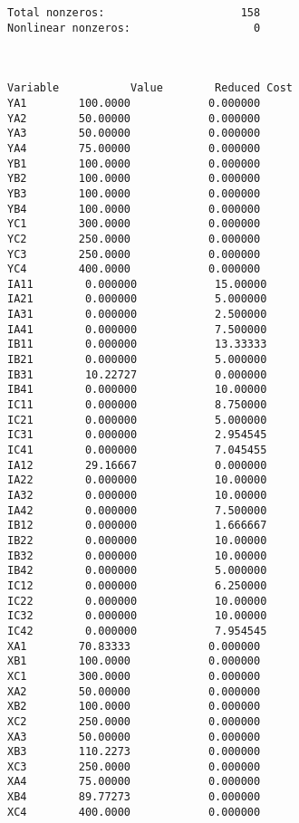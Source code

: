 \documentclass[12pt]{article}
\begin{document}
\begin{appendices}
\begin{lstlisting}
Total nonzeros:                     158
Nonlinear nonzeros:                   0



Variable           Value        Reduced Cost
YA1        100.0000            0.000000
YA2        50.00000            0.000000
YA3        50.00000            0.000000
YA4        75.00000            0.000000
YB1        100.0000            0.000000
YB2        100.0000            0.000000
YB3        100.0000            0.000000
YB4        100.0000            0.000000
YC1        300.0000            0.000000
YC2        250.0000            0.000000
YC3        250.0000            0.000000
YC4        400.0000            0.000000
IA11        0.000000            15.00000
IA21        0.000000            5.000000
IA31        0.000000            2.500000
IA41        0.000000            7.500000
IB11        0.000000            13.33333
IB21        0.000000            5.000000
IB31        10.22727            0.000000
IB41        0.000000            10.00000
IC11        0.000000            8.750000
IC21        0.000000            5.000000
IC31        0.000000            2.954545
IC41        0.000000            7.045455
IA12        29.16667            0.000000
IA22        0.000000            10.00000
IA32        0.000000            10.00000
IA42        0.000000            7.500000
IB12        0.000000            1.666667
IB22        0.000000            10.00000
IB32        0.000000            10.00000
IB42        0.000000            5.000000
IC12        0.000000            6.250000
IC22        0.000000            10.00000
IC32        0.000000            10.00000
IC42        0.000000            7.954545
XA1        70.83333            0.000000
XB1        100.0000            0.000000
XC1        300.0000            0.000000
XA2        50.00000            0.000000
XB2        100.0000            0.000000
XC2        250.0000            0.000000
XA3        50.00000            0.000000
XB3        110.2273            0.000000
XC3        250.0000            0.000000
XA4        75.00000            0.000000
XB4        89.77273            0.000000
XC4        400.0000            0.000000


\end{lstlisting}
\end{appendices}
\end{document}
